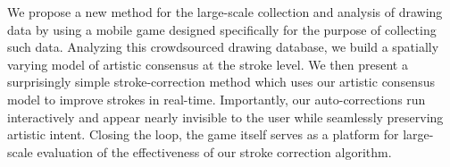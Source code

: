 
We propose a new method for the large-scale collection and analysis
of drawing data by using a mobile game designed specifically for
the purpose of collecting such data. Analyzing this crowdsourced
drawing database, we build a spatially varying model of artistic
consensus at the stroke level. We then present a surprisingly simple
stroke-correction method which uses our artistic consensus model to
improve strokes in real-time. Importantly, our auto-corrections run
interactively and appear nearly invisible to the user while
seamlessly preserving artistic intent. Closing the loop, the game
itself serves as a platform for large-scale evaluation of the
effectiveness of our stroke correction algorithm.
